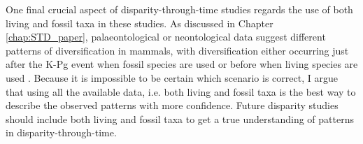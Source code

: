 One final crucial aspect of disparity-through-time studies regards the use of both living and fossil taxa in these studies.
As discussed in Chapter \ref{chap:STD_paper}, palaeontological or neontological data suggest different patterns of diversification in mammals, with diversification either occurring just after the K-Pg event when fossil species are used \citep[suggesting an effect of K-Pg;][]{O'Leary08022013} or before when living species are used \citep[rejecting an effect of K-Pg;][]{meredithimpacts2011,dosReis2014}.
Because it is impossible to be certain which scenario is correct, I argue that using all the available data, i.e. both living and fossil taxa \citep{Slater2012MEE,beckancient2014} is the best way to describe the observed patterns with more confidence.
Future disparity studies should include both living and fossil taxa to get a true understanding of patterns in disparity-through-time.

